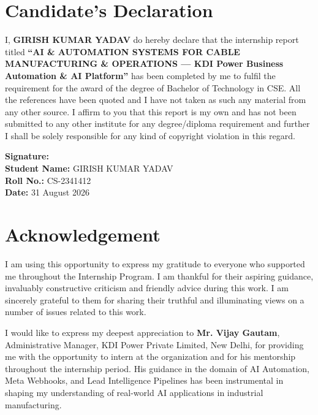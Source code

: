 \documentclass[12pt,a4paper]{report}
\begin{document}
\chapter*{Candidate's Declaration}

I, \textbf{GIRISH KUMAR YADAV} do hereby declare that the internship report titled \textbf{``AI \& AUTOMATION SYSTEMS FOR CABLE MANUFACTURING \& OPERATIONS --- KDI Power Business Automation \& AI Platform''} has been completed by me to fulfil the requirement for the award of the degree of Bachelor of Technology in CSE. All the references have been quoted and I have not taken as such any material from any other source. I affirm to you that this report is my own and has not been submitted to any other institute for any degree/diploma requirement and further I shall be solely responsible for any kind of copyright violation in this regard.

\vspace{2cm}

\noindent
\textbf{Signature:} \underline{\hspace{5cm}}\\[0.5cm]
\textbf{Student Name:} GIRISH KUMAR YADAV\\[0.3cm]
\textbf{Roll No.:} CS-2341412\\[0.3cm]
\textbf{Date:} 31 August 2026

\newpage

\thispagestyle{empty}
\chapter*{Acknowledgement}

I am using this opportunity to express my gratitude to everyone who supported me throughout the Internship Program. I am thankful for their aspiring guidance, invaluably constructive criticism and friendly advice during this work. I am sincerely grateful to them for sharing their truthful and illuminating views on a number of issues related to this work.

I would like to express my deepest appreciation to \textbf{Mr. Vijay Gautam}, Administrative Manager, KDI Power Private Limited, New Delhi, for providing me with the opportunity to intern at the organization and for his mentorship throughout the internship period. His guidance in the domain of AI Automation, Meta Webhooks, and Lead Intelligence Pipelines has been instrumental in shaping my understanding of real-world AI applications in industrial manufacturing.
\end{document}
